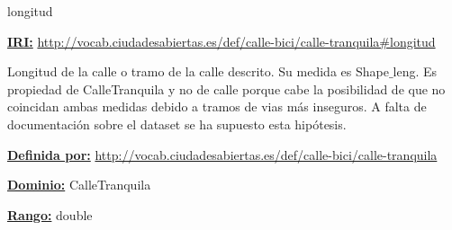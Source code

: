 \begin{mybox}{longitud}
\begin{flushleft}
\underline{\textbf{IRI:}}
\url{http://vocab.ciudadesabiertas.es/def/calle-bici/calle-tranquila#longitud}
\newline

Longitud de la calle o tramo de la calle descrito. Su medida es Shape$\_$leng.
Es propiedad de CalleTranquila y no de calle porque cabe la posibilidad de que no coincidan ambas medidas debido a tramos de vias más inseguros. A falta de documentación sobre el dataset se ha supuesto esta hipótesis.
\newline

\underline{\textbf{Definida por:}}
\url{http://vocab.ciudadesabiertas.es/def/calle-bici/calle-tranquila}
\newline

\underline{\textbf{Dominio:}}
		CalleTranquila
\newline

\underline{\textbf{Rango:}}
		double

\end{flushleft}
\end{mybox}













